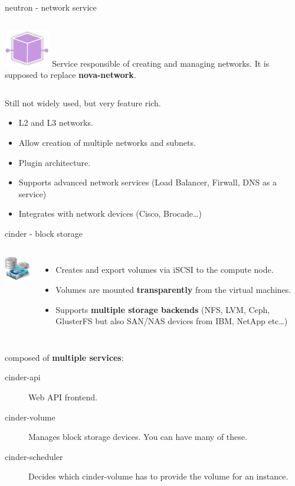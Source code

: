 \documentclass[english,serif,mathserif,usenames,dvipsnames]{beamer}
\begin{document}
\begin{frame}
  {neutron - network service}

  \begin{columns}
    \column{2cm}
    \includegraphics[width=2cm]{openstack-networking-icon.png}
    \column{8cm}
    Service responsible of creating and managing networks. It is
    supposed to replace \textbf{nova-network}.
  \end{columns}

  \+\+
  Still not widely used, but very feature rich.


  \begin{itemize}
  \item L2 and L3 networks.
  \item Allow creation of multiple networks and subnets.
  \item Plugin architecture.
  \item Supports advanced network services (Load Balancer, Firwall,
    DNS as a service)
  \item Integrates with network devices (Cisco, Brocade\ldots)
  \end{itemize}
\end{frame}


\begin{frame}
  {cinder - block storage}
  \begin{columns}
    \column{2cm}
    \includegraphics[width=2cm]{block_storage.png}
    \column{9cm}
    \begin{itemize}
    \item Creates and export volumes via iSCSI to the compute node.
    \item Volumes are mounted \textbf{transparently} from the virtual
      machines.
    \item Supports \textbf{multiple storage backends} (NFS, LVM, Ceph,
      GlusterFS but also SAN/NAS devices from IBM, NetApp etc\ldots )
    \end{itemize}
  \end{columns}

  \+
  composed of \textbf{multiple services}:
  \begin{description}
  \item[cinder-api] Web API frontend.
  \item[cinder-volume] Manages block storage devices. You can have
    many of these.
  \item[cinder-scheduler] Decides which cinder-volume has to provide
    the volume for an instance.
  \end{description}
\end{frame}
\end{document}
